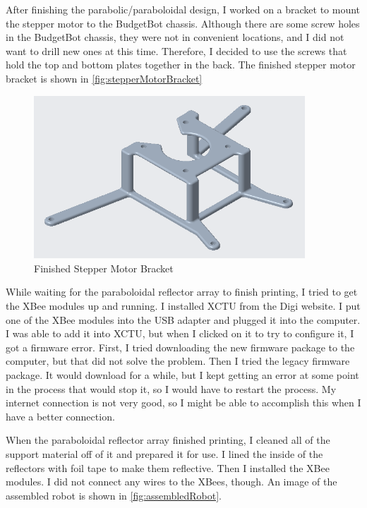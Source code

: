 \documentclass[fontsize=11pt, %
                             paper=letter, %
                             openany, %
                             captions=tableheading,
                             index=totoc,
                             hyperref]{labbook}
\begin{document}
\begin{addmargin}[0cm]{0cm}
After finishing the parabolic/paraboloidal design, I worked on a bracket to mount the stepper motor to the BudgetBot chassis. Although there are some screw holes in the BudgetBot chassis, they were not in convenient locations, and I did not want to drill new ones at this time. Therefore, I decided to use the screws that hold the top and bottom plates together in the back. The finished stepper motor bracket is shown in \autoref{fig:stepperMotorBracket}

\begin{figure}[h!]
    \center
    \includegraphics[width=4in]{figs/img/stepperMotorBracket.png}
    \caption{Finished Stepper Motor Bracket}
    \label{fig:stepperMotorBracket}
\end{figure}

While waiting for the paraboloidal reflector array to finish printing, I tried to get the XBee modules up and running. I installed XCTU from the Digi website. I put one of the XBee modules into the USB adapter and plugged it into the computer. I was able to add it into XCTU, but when I clicked on it to try to configure it, I got a firmware error. First, I tried downloading the new firmware package to the computer, but that did not solve the problem. Then I tried the legacy firmware package. It would download for a while, but I kept getting an error at some point in the process that would stop it, so I would have to restart the process. My internet connection is not very good, so I might be able to accomplish this when I have a better connection.

\vspace{12pt}
When the paraboloidal reflector array finished printing, I cleaned all of the support material off of it and prepared it for use. I lined the inside of the reflectors with foil tape to make them reflective. Then I installed the XBee modules. I did not connect any wires to the XBees, though. An image of the assembled robot is shown in \autoref{fig:assembledRobot}.


\end{addmargin}
\end{document}
